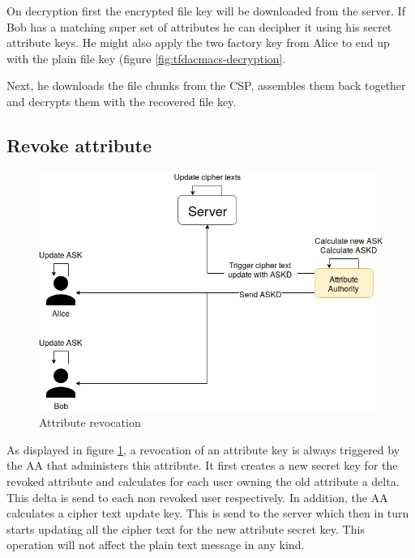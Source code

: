 On decryption first the encrypted file key will be downloaded from the server. If Bob has a matching super set of attributes he can decipher it using his secret attribute keys. He might also apply the two factory key from Alice to end up with the plain file key (figure \ref{fig:tfdacmacs-decryption}. 

Next, he downloads the file chunks from the CSP, assembles them back together and decrypts them with the recovered file key.

\subsection{Revoke attribute}
\begin{figure}[!t]
\centering
    \includegraphics[width=\linewidth]{img/TF-DAC-MACS-overview-revoce-attr.png}
    \caption{Attribute revocation}
    \label{fig:tfdacmacs-attr-revocation}
\end{figure}

As displayed in figure \ref{fig:tfdacmacs-attr-revocation}, a revocation of an attribute key is always triggered by the AA that administers this attribute. It first creates a new secret key for the revoked attribute and calculates for each user owning the old attribute a delta. This delta is send to each non revoked user respectively. In addition, the AA calculates a cipher text update key. This is send to the server which then in turn starts updating all the cipher text for the new attribute secret key. This operation will not affect the plain text message in any kind. 


